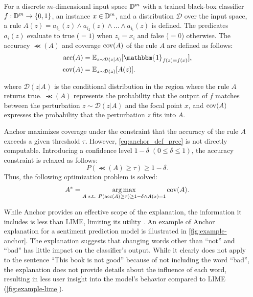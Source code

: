 \documentclass[runningheads]{llncs}
\begin{document}
For a discrete $m$-dimensional input space $\mathbb{D}^{m}$
with a trained black-box classifier $f: \mathbb{D}^{m} \to \{0,1\}$,
an instance $x \in \mathbb{D}^{m}$,
and a distribution $\mathcal{D}$ over the input space,
a rule $A(z) = a_{i_1}(z) \wedge a_{i_2}(z) \wedge \dots \wedge a_{i_t}(z)$ is defined.
The predicates $a_i(z)$ evaluate to true ($=1$) when $z_i = x_i$ and false ($=0$) otherwise.
The accuracy $\Prec(A)$ and coverage $\operatorname{cov}(A)$ of the rule $A$ are defined as follows:
\begin{align}
	\Prec(A) & =\mathbb{E}_{z\sim\mathcal{D}(z|A)}
	[\mathbbm{1}_{f(z)=f(x)}], \label{eq:anchor_def_prec} \\
	\Cov(A)  & =\mathbb{E}_{z\sim\mathcal{D}(z)}[A(z)].
\end{align}

where $\mathcal{D}(z|A)$ is the conditional distribution in the region
where the rule $A$ returns true.
$\Prec(A)$ represents the probability that the output of $f$ matches
between the perturbation $z\sim\mathcal{D}(z|A)$ and the focal point $x$,
and $\operatorname{cov}(A)$ expresses the probability that the perturbation $z$ fits into $A$.

Anchor maximizes coverage under the constraint that
the accuracy of the rule $A$ exceeds a given threshold $\tau$.
However, \cref{eq:anchor_def_prec} is not directly computable.
Introducing a confidence level $1-\delta$ $(0\le\delta\le1)$,
the accuracy constraint is relaxed as follows:
\begin{equation}
	\label{eq:const_prec}
	P(\Prec(A)\ge\tau)\ge1-\delta.
\end{equation}
Thus, the following optimization problem is solved:
\begin{equation}
	\label{eq:main_problem}
	A^*=\underset{A \text{~s.t. } P(\operatorname{acc}(A)\ge\tau)\ge1-\delta\wedge A(x)=1}
	{\arg\max}\operatorname{cov}(A).
\end{equation}

While Anchor provides an effective scope of the explanation,
the information it includes is less than LIME,
limiting its utility \cite{ribeiro2018anchors}.
An example of Anchor explanation for a sentiment prediction model
is illustrated in \cref{fig:example-anchor}.
The explanation suggests that changing words other than ``not'' and ``bad''
has little impact on the classifier's output.
While it clearly does not apply to the sentence ``This book is not good''
because of not including the word ``bad'',
the explanation does not provide details about the influence of each word,
resulting in less user insight into the model's behavior compared to LIME
(\cref{fig:example-lime}).
\end{document}
